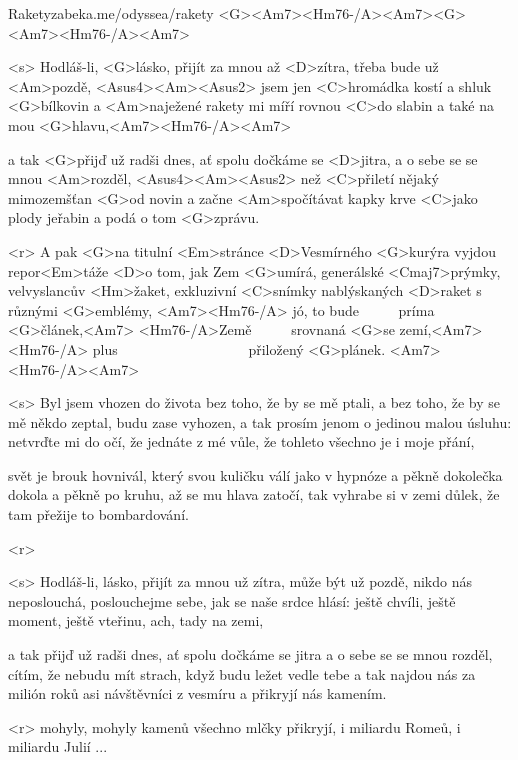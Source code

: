 \begin{song}{68}{Rakety}{zabeka.me/odyssea/rakety}
	<G><Am7><Hm76-/A><Am7><G><Am7><Hm76-/A><Am7>

	<s> Hodláš-li, <G>lásko, přijít za mnou až <D>zítra,
	třeba bude už <Am>pozdě, <Asus4><Am><Asus2>
	jsem jen <C>hromádka kostí a shluk <G>bílkovin
	a <Am>naježené rakety mi míří rovnou <C>do slabin
	a také na mou <G>hlavu,<Am7><Hm76-/A><Am7>

	a tak <G>přijď už radši dnes, ať spolu dočkáme se <D>jitra,
	a o sebe se se mnou <Am>rozděl, <Asus4><Am><Asus2>
	než <C>přiletí nějaký mimozemšťan <G>od novin
	a začne <Am>spočítávat kapky krve <C>jako plody jeřabin
	a podá o tom <G>zprávu.

	<r> A pak <G>na titulní <Em>stránce <D>Vesmírného <G>kurýra
	vyjdou repor<Em>táže <D>o tom, jak Zem <G>umírá,
	generálské <Cmaj7>prýmky, velvyslancův <Hm>žaket,
	exkluzivní <C>snímky nablýskaných <D>raket
	s různými <G>emblémy, <Am7><Hm76-/A> jó, to bude \ \ \ \ \ <Am7>príma <G>článek,<Am7>
	<Hm76-/A>Země \ \ \ \ \ <Am7>srovnaná <G>se zemí,<Am7><Hm76-/A> plus \ \ \ \ \ \ \ \ \ \ \ \ \ \ \ \ \ \ <Am7>přiložený <G>plánek.
	<Am7><Hm76-/A><Am7>

	<s> Byl jsem vhozen do života bez toho, že by se mě ptali,
	a bez toho, že by se mě někdo zeptal, budu zase vyhozen,
	a tak prosím jenom o jedinou malou úsluhu:
	netvrďte mi do očí, že jednáte z mé vůle,
	že tohleto všechno je i moje přání,

	svět je brouk hovnivál, který svou kuličku válí
	jako v hypnóze
	a pěkně dokolečka dokola a pěkně po kruhu,
	až se mu hlava zatočí, tak vyhrabe si v zemi důlek,
	že tam přežije to bombardování.

	<r>

	<s> Hodláš-li, lásko, přijít za mnou už zítra,
	může být už pozdě,
	nikdo nás neposlouchá, poslouchejme sebe,
	jak se naše srdce hlásí: ještě chvíli, ještě moment,
	ještě vteřinu, ach, tady na zemi,

	a tak přijď už radši dnes, ať spolu dočkáme se jitra
	a o sebe se se mnou rozděl,
	cítím, že nebudu mít strach, když budu ležet vedle tebe
	a tak najdou nás za milión roků asi návštěvníci z vesmíru
	a přikryjí nás kamením.

	<r>
	mohyly, mohyly kamenů všechno mlčky přikryjí,
	i miliardu Romeů, i miliardu Julií ...


\end{song}
